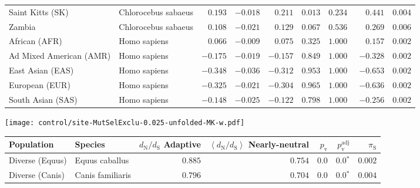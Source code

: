 \begin{center}
\begin{adjustbox}{width = 1\textwidth}
\begin{tabular}{|l|l|r|r|r|r|r|r|r|}
            Saint Kitts (SK)                  & Chlorocebus sabaeus        & $ 0.193$ & $-0.018$  & $ 0.211$ & $ 0.013$ & $ 0.234~~$        & $ 0.441$ & $ 0.004$ \\
            Zambia        & Chlorocebus sabaeus        & $ 0.108$ & $-0.021$  & $ 0.129$ & $ 0.067$ & $ 0.536~~$ & $ 0.269$ & $ 0.006$ \\
            African (AFR)               & Homo sapiens        & $ 0.066$ & $-0.009$  & $ 0.075$ & $ 0.325$ & $ 1.000~~$        & $ 0.157$ & $ 0.002$ \\
            Ad Mixed American (AMR)                 & Homo sapiens        & $-0.175$ & $-0.019$  & $-0.157$ & $ 0.849$ & $ 1.000~~$        & $-0.328$ & $ 0.002$ \\
            East Asian (EAS)              & Homo sapiens        & $-0.348$ & $-0.036$  & $-0.312$ & $ 0.953$ & $ 1.000~~$        & $-0.653$ & $ 0.002$ \\
            European (EUR)              & Homo sapiens        & $-0.325$ & $-0.021$  & $-0.304$ & $ 0.965$ & $ 1.000~~$        & $-0.636$ & $ 0.002$ \\
            South Asian (SAS)              & Homo sapiens        & $-0.148$ & $-0.025$  & $-0.122$ & $ 0.798$ & $ 1.000~~$        & $-0.256$ & $ 0.002$ \\
            \bottomrule
        \end{tabular}
    \end{adjustbox}
    \newpage
    \texttt{[image: control/site-MutSelExclu-0.025-unfolded-MK-w.pdf]}
    \begin{adjustbox}{width = 1\textwidth}
        \begin{tabular}{|l|l|r|r|r|r|r|}
            \toprule
            Population & Species & \specialcell{$d_{\mathrm{N}} / d_{\mathrm{S}}$ \\ Adaptive}                & \specialcell{$\left< d_{\mathrm{N}} / d_{\mathrm{S}} \right>$ \\ Nearly-neutral}                & $p_{\mathrm{v}}$    & $p_{\mathrm{v}}^{\mathrm{adj}}$ & $\pi_{\textrm{S}}$ \\
            \midrule
            Diverse (Equus)                    & Equus caballus          & $ 0.885$ & $ 0.754$ & $0.0$ & $\bm{0.0{^*}}$     & $ 0.002$ \\
            Diverse (Canis)                  & Canis familiaris          & $ 0.796$ & $ 0.704$ & $0.0$ & $\bm{0.0{^*}}$     & $ 0.004$ \\

\end{tabular}
\end{adjustbox}
\end{center}
